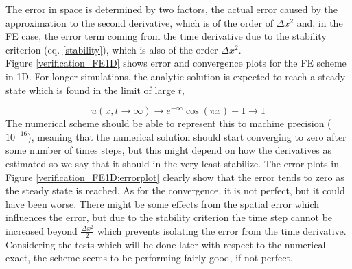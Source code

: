 The error in space is determined by two factors, the actual error caused by the approximation to the second derivative, which is of the order of $\Delta x^2$ and, in the FE case, the error term coming from the time derivative due to the stability criterion (eq. \ref{stability}), which is also of the order $\Delta x^2$. \\
Figure \ref{verification_FE1D} shows error and convergence plots for the FE scheme in 1D. 
For longer simulations, the analytic solution is expected to reach a steady state which is found in the limit of large $t$, 

\begin{equation}
 u(x,t\to\infty) \to e^{-\infty}\cos(\pi x) +1 \to 1
\end{equation}
The numerical scheme should be able to represent this to machine precision ($10^{-16}$), meaning that the numerical solution should start converging to zero after some number of times steps, but this might depend on how the derivatives as estimated so we say that it should in the very least stabilize. 
The error plots in Figure \ref{verification_FE1D:errorplot} clearly show that the error tends to zero as the steady state is reached. 
As for the convergence, it is not perfect, but it could have been worse. There might be some effects from the spatial error which influences the error, but due to the stability criterion the time step cannot be increased beyond $\frac{\Delta x^2}{2}$ which prevents isolating the error from the time derivative. 
Considering the tests which will be done later with respect to the numerical exact, the scheme seems to be performing fairly good, if not perfect.

